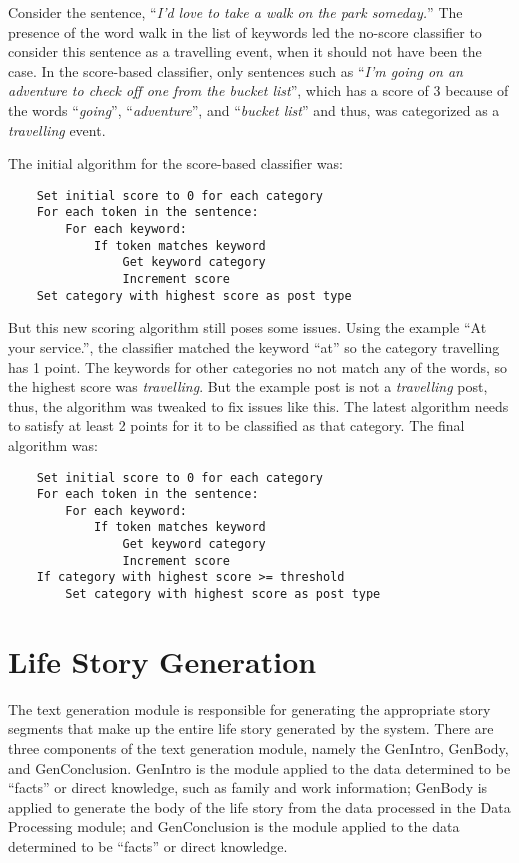 Consider the sentence, ``\textit{I'd love to take a walk on the park someday.}'' The presence of the word walk in the list of keywords led the no-score classifier to consider this sentence as a travelling event, when it should not have been the case. In the score-based classifier, only sentences such as ``\textit{I'm going on an adventure to check off one from the bucket list}'', which has a score of 3 because of the words ``\textit{going}'', ``\textit{adventure}'', and ``\textit{bucket list}'' and thus, was categorized as a \textit{travelling} event.

The initial algorithm for the score-based classifier was:
\begin{lstlisting}
	Set initial score to 0 for each category
	For each token in the sentence:
		For each keyword:
			If token matches keyword
				Get keyword category
				Increment score
	Set category with highest score as post type
\end{lstlisting}

But this new scoring algorithm still poses some issues. Using the example ``At your service.'', the classifier matched the keyword ``at'' so the category travelling has 1 point. The keywords for other categories no not match any of the words, so the highest score was \textit{travelling}. But the example post is not a \textit{travelling} post, thus, the algorithm was tweaked to fix issues like this. The latest algorithm needs to satisfy at least 2 points for it to be classified as that category. The final algorithm was:
\begin{lstlisting}
	Set initial score to 0 for each category
	For each token in the sentence:
		For each keyword:
			If token matches keyword
				Get keyword category
				Increment score
	If category with highest score >= threshold
		Set category with highest score as post type
\end{lstlisting}

\section{Life Story Generation}
The text generation module is responsible for generating the appropriate story segments that make up the entire life story generated by the system. There are three components of the text generation module, namely the GenIntro, GenBody, and GenConclusion. GenIntro is the module applied to the data determined to be ``facts'' or direct knowledge, such as family and work information; GenBody is applied to generate the body of the life story from the data processed in the Data Processing module; and GenConclusion is the module applied to the data determined to be ``facts'' or direct knowledge.


